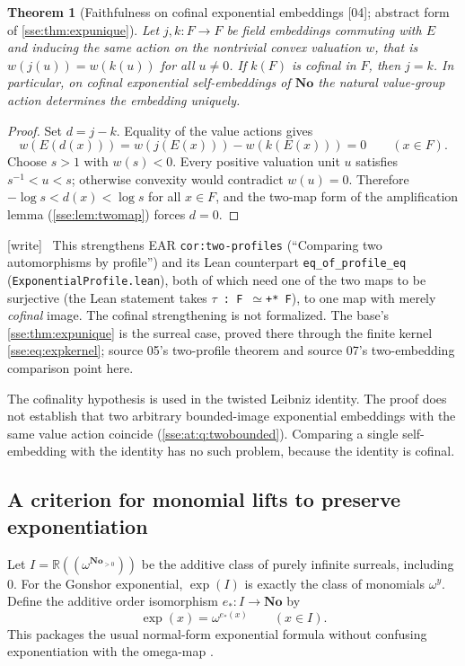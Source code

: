 \documentclass[11pt,a4paper]{article}
\numberwithin{equation}{section}
\theoremstyle{plain}
\newtheorem{theorem}{Theorem}[section]
\theoremstyle{definition}
\theoremstyle{remark}
\newcommand{\No}{\mathbf{No}}
\newcommand{\R}{\mathbb{R}}
\newcommand{\NF}[1]{\R((\omega^{#1}))}
\newcommand{\code}[1]{\texttt{\small #1}}
\newcommand{\lbl}[1]{\nolinkurl{#1}}%
\newcommand{\fn}[1]{\nolinkurl{#1}}%
\newcommand{\src}[1]{\textup{\textsf{\small[#1]}}}%
\newcommand{\wtag}{\textup{\textsf{[write]}}}%
\newenvironment{wnote}{\par\smallskip\noindent\wtag\ }{\par\smallskip}
\newcommand{\declat}[1]{\nolinkurl{#1}}%
\begin{document}
\begin{theorem}[Faithfulness on cofinal exponential embeddings \src{04}; abstract form of \cref{sse:thm:expunique}]
\label{sse:at:thm:pair-rigidity}
Let $j,k:F\to F$ be field embeddings commuting with $E$ and inducing the same
action on the nontrivial convex valuation $w$, that is
$w(j(u))=w(k(u))$ for all $u\ne0$. If $k(F)$ is cofinal in $F$, then $j=k$. In
particular, on cofinal exponential self-embeddings of $\No$ the natural
value-group action determines the embedding uniquely.
\end{theorem}
\begin{proof}
Set $d=j-k$. Equality of the value actions gives
\[
 w(E(d(x)))=w(j(E(x)))-w(k(E(x)))=0\qquad(x\in F).
\]
Choose $s>1$ with $w(s)<0$. Every positive valuation unit $u$ satisfies
$s^{-1}<u<s$; otherwise convexity would contradict $w(u)=0$. Therefore
$-\log s<d(x)<\log s$ for all $x\in F$, and the two-map form of the
amplification lemma (\cref{sse:lem:twomap}) forces $d=0$.
\end{proof}
\begin{wnote}
This strengthens EAR \lbl{cor:two-profiles} (``Comparing two automorphisms by
profile'') and its Lean counterpart \declat{eq_of_profile_eq}
(\fn{ExponentialProfile.lean}), both of which need one of the two maps to be
surjective (the Lean statement takes \code{$\tau$ : F $\simeq$+* F}), to one map
with merely \emph{cofinal} image. The cofinal strengthening is not
formalized. The base's \cref{sse:thm:expunique} is the surreal case, proved
there through the finite kernel \eqref{sse:eq:expkernel}; source 05's
two-profile theorem and source 07's two-embedding comparison point here.
\end{wnote}
The cofinality hypothesis is used in the twisted Leibniz identity. The proof
does not establish that two arbitrary bounded-image exponential embeddings
with the same value action coincide (\cref{sse:at:q:twobounded}). Comparing a
single self-embedding with the identity has no such problem, because the
identity is cofinal.

\subsection{A criterion for monomial lifts to preserve exponentiation}
Let $I=\NF{\No_{>0}}$ be the additive class of purely infinite surreals,
including $0$. For the Gonshor exponential, $\exp(I)$ is exactly the class of
monomials $\omega^y$. Define the additive order isomorphism $e_*:I\to\No$ by
\begin{equation}\label{sse:at:eq:estar}
 \exp(x)=\omega^{e_*(x)}\qquad(x\in I).
\end{equation}
This packages the usual normal-form exponential formula without confusing
exponentiation with the omega-map \cite{Gonshor}.
\end{document}

